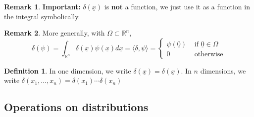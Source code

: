 \documentclass[12pt,a4paper]{article}
\theoremstyle{definition}
\newtheorem{definition}{Definition}[subsection]
\newtheorem*{remark}{Remark}
\begin{document}
\begin{remark}
	\textbf{Important:} $\delta(\underline{x})$ is \textbf{not} a function, we just use it as a function in the integral symbolically.
\end{remark}

\begin{remark}
	More generally, with $\Omega \subset \mathbb{R}^n$,
	\[
		\delta(\psi) = \int_{\mathbb{R}^n} \delta(\underline{x}) \psi(\underline{x}) d\underline{x} = \langle \delta, \psi \rangle = \begin{cases}
			\psi(\underline{0}) & \text{ if } \underline{0} \in \Omega \\
			0 & \text{ otherwise}
		\end{cases}
	\]
\end{remark}

\begin{definition}
	In one dimension, we write $\delta(\underline{x}) = \delta(\underline{x})$. In $n$ dimensions, we write $\delta(x_1, \dots, x_n) = \delta(x_1) \cdots \delta(x_n)$
\end{definition}

\subsection{Operations on distributions}
\end{document}
